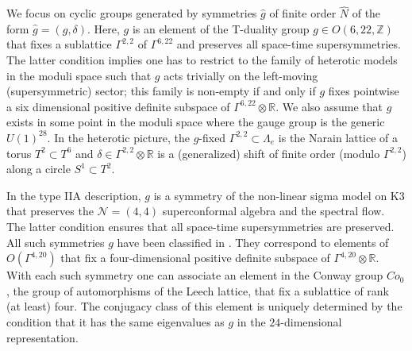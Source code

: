 \documentclass[a4paper,11pt]{article}
\newcommand{\RR}{\mathbb{R}}
\newcommand{\ZZ}{\mathbb{Z}}
\newcommand{\N}{\mathcal{N}}
\numberwithin{equation}{section}
\begin{document}
We focus on cyclic groups generated by symmetries $\hat g$ of finite order $\hat N$ of the form $\hat g=(g,\delta)$. Here, $g$ is an element of the T-duality group $g\in O(6,22,\ZZ)$ that fixes a sublattice $\Gamma^{2,2}$ of $\Gamma^{6,22}$ and preserves all space-time supersymmetries. The latter condition implies  one has to restrict to the family of heterotic models in the moduli space such that $g$ acts trivially on the left-moving (supersymmetric) sector; this family is non-empty if and only if $g$ fixes pointwise a six dimensional positive definite subspace of $\Gamma^{6,22}\otimes \RR$. We also assume that $g$ exists in some point in the moduli space where the gauge group is the generic $U(1)^{28}$. In the heterotic picture, the $g$-fixed $\Gamma^{2,2}\subset \Lambda_e$ is the Narain lattice of a torus  $T^2\subset T^6$ and $\delta\in \Gamma^{2,2}\otimes \RR$ is a (generalized) shift of finite order (modulo $\Gamma^{2,2}$) along a circle $S^1\subset T^2$.

In the type IIA description, $g$ is a symmetry of the non-linear sigma model on K3 that preserves the $\N=(4,4)$ superconformal algebra and the spectral flow. The latter condition ensures that all space-time supersymmetries are preserved. All such symmetries $g$ have been classified in \cite{K3symm}. They correspond to elements of $O(\Gamma^{4,20})$ that fix a four-dimensional positive definite subspace of $\Gamma^{4,20}\otimes \RR$. With each such symmetry one can associate an element in the Conway group $Co_0$, the group of automorphisms of the Leech lattice, that fix a sublattice of rank (at least) four. The conjugacy class of this element is uniquely determined by the condition that it has the same eigenvalues as $g$ in the $24$-dimensional representation.

\bigskip

\end{document}
